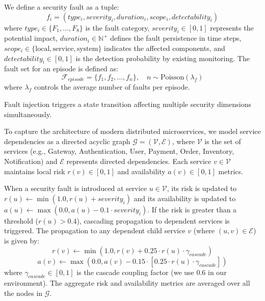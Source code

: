 \documentclass[conference,10pt]{IEEEtran}
\begin{document}
We define a security fault as a tuple:
\begin{equation}
	f_i = (type_i, severity_i, duration_i, scope_i, detectability_i)
\end{equation}
where $type_i \in \{F_1, \ldots, F_8\}$ is the fault category, $severity_i \in [0, 1]$ represents the potential impact, $duration_i \in \mathbb{N}^+$ defines the fault persistence in time steps, $scope_i \in \{\text{local}, \text{service}, \text{system}\}$ indicates the affected components, and $detectability_i \in [0, 1]$ is the detection probability by existing monitoring.
The fault set for an episode is defined as:
\begin{equation}
	\mathcal{F}_{episode} = \{f_1, f_2, \ldots, f_n\}, \quad n \sim \text{Poisson}(\lambda_f)
\end{equation}
where $\lambda_f$ controls the average number of faults per episode.

Fault injection triggers a state transition affecting multiple security dimensions simultaneously.

To capture the architecture of modern distributed microservices, we model service dependencies as a directed acyclic graph $\mathcal{G} = (\mathcal{V}, \mathcal{E})$, where $\mathcal{V}$ is the set of services (e.g., Gateway, Authentication, User, Payment, Order, Inventory, Notification) and $\mathcal{E}$ represents directed dependencies. Each service $v \in \mathcal{V}$ maintains local risk $r(v) \in [0, 1]$ and availability $a(v) \in [0, 1]$ metrics.

When a security fault is introduced at service $u \in \mathcal{V}$, its risk is updated to $r(u) \leftarrow \min(1.0, r(u) + severity_i)$ and its availability is updated to $a(u) \leftarrow \max(0.0, a(u) - 0.1 \cdot severity_i)$. If the risk is greater than a threshold ($r(u) > 0.4$), cascading propagation to dependent services is triggered. The propagation to any dependent child service $v$ (where $(u, v) \in \mathcal{E}$) is given by: 
\begin{equation}
	r(v) \leftarrow \min\left(1.0, r(v) + 0.25 \cdot r(u) \cdot \gamma_{cascade}\right)
\end{equation}
\begin{equation}
	a(v) \leftarrow \max\left(0.0, a(v) - 0.15 \cdot \left[0.25 \cdot r(u) \cdot \gamma_{cascade}\right]\right)
\end{equation}
where $\gamma_{cascade} \in [0, 1]$ is the cascade coupling factor (we use $0.6$ in our environment). The aggregate risk and availability metrics are averaged over all the nodes in $\mathcal{G}$. 
\end{document}
